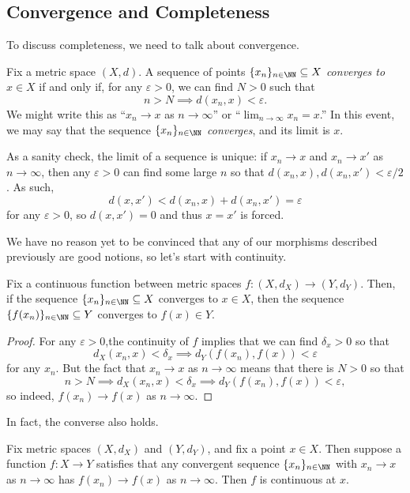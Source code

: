 \documentclass[../notes.tex]{subfiles}
\begin{document}
\subsection{Convergence and Completeness}
To discuss completeness, we need to talk about convergence.
\begin{definition}[Converge]
	Fix a metric space $(X,d)$. A sequence of points $\{x_n\}_{n\in\NN}\subseteq X$ \textit{converges to} $x\in X$ if and only if, for any $\varepsilon>0$, we can find $N>0$ such that
	\[n>N\implies d(x_n,x)<\varepsilon.\]
	We might write this as ``$x_n\to x$ as $n\to\infty$'' or ``$\lim_{n\to\infty}x_n=x$.'' In this event, we may say that the sequence $\{x_n\}_{n\in\NN}$ \textit{converges}, and its limit is $x$.
\end{definition}
\begin{remark}[Nir] \label{rem:uniqlim}
	As a sanity check, the limit of a sequence is unique: if $x_n\to x$ and $x_n\to x'$ as $n\to\infty$, then any $\varepsilon>0$ can find some large $n$ so that $d(x_n,x),d(x_n,x')<\varepsilon/2$. As such,
	\[d(x,x')<d(x_n,x)+d(x_n,x')=\varepsilon\]
	for any $\varepsilon>0$, so $d(x,x')=0$ and thus $x=x'$ is forced.
\end{remark}
We have no reason yet to be convinced that any of our morphisms described previously are good notions, so let's start with continuity.
\begin{lemma} \label{lem:contpreservesconverge}
	Fix a continuous function between metric spaces $f\colon(X,d_X)\to(Y,d_Y)$. Then, if the sequence $\{x_n\}_{n\in\NN}\subseteq X$ converges to $x\in X$, then the sequence $\{f(x_n)\}_{n\in\NN}\subseteq Y$ converges to $f(x)\in Y$.
\end{lemma}
\begin{proof}
	For any $\varepsilon>0$,the continuity of $f$ implies that we can find $\delta_x>0$ so that
	\[d_X(x_n,x)<\delta_x\implies d_Y(f(x_n),f(x))<\varepsilon\]
	for any $x_n$. But the fact that $x_n\to x$ as $n\to\infty$ means that there is $N>0$ so that
	\[n>N\implies d_X(x_n,x)<\delta_x\implies d_Y(f(x_n),f(x))<\varepsilon,\]
	so indeed, $f(x_n)\to f(x)$ as $n\to\infty$.
\end{proof}
In fact, the converse also holds.
\begin{lemma} \label{lem:continuityconverse}
	Fix metric spaces $(X,d_X)$ and $(Y,d_Y)$, and fix a point $x\in X$. Then suppose a function $f\colon X\to Y$ satisfies that any convergent sequence $\{x_n\}_{n\in\NN}$ with $x_n\to x$ as $n\to\infty$ has $f(x_n)\to f(x)$ as $n\to\infty$. Then $f$ is continuous at $x$.
\end{lemma}
\end{document}
